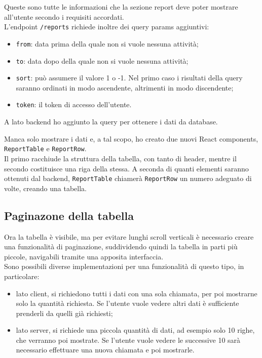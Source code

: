 Queste sono tutte le informazioni che la sezione report deve poter mostrare all'utente secondo i requisiti accordati.\\
L'endpoint \texttt{/reports} richiede inoltre dei query params aggiuntivi:
\begin{itemize}
  \item \texttt{from}: data prima della quale non si vuole nessuna attività;
  \item \texttt{to}: data dopo della quale non si vuole nessuna attività;
  \item \texttt{sort}: può assumere il valore 1 o -1. Nel primo caso i risultati della query saranno ordinati in modo ascendente, altrimenti in modo discendente;
  \item \texttt{token}: il token di accesso dell'utente.
\end{itemize}

A lato backend ho aggiunto la query per ottenere i dati da database.

Manca solo mostrare i dati e, a tal scopo, ho creato due nuovi React components, \texttt{ReportTable} e \texttt{ReportRow}.\\
Il primo racchiude la struttura della tabella, con tanto di header, mentre il secondo costituisce una riga della stessa. A seconda di quanti elementi saranno ottenuti dal backend, \texttt{ReportTable} chiamerà \texttt{ReportRow} un numero adeguato di volte, creando una tabella.

\subsection{Paginazone della tabella}

Ora la tabella è visibile, ma per evitare lunghi scroll verticali è necessario creare una funzionalità di paginazione, suddividendo quindi la tabella in parti più piccole, navigabili tramite una apposita interfaccia.\\
Sono possibili diverse implementazioni per una funzionalità di questo tipo, in particolare:
\begin{itemize}
  \item lato client, si richiedono tutti i dati con una sola chiamata, per poi mostrarne solo la quantità richiesta. Se l'utente vuole vedere altri dati è sufficiente prenderli da quelli già richiesti;
  \item lato server, si richiede una piccola quantità di dati, ad esempio solo 10 righe, che verranno poi mostrate. Se l'utente vuole vedere le successive 10 sarà necessario effettuare una nuova chiamata e poi mostrarle. 
\end{itemize}

